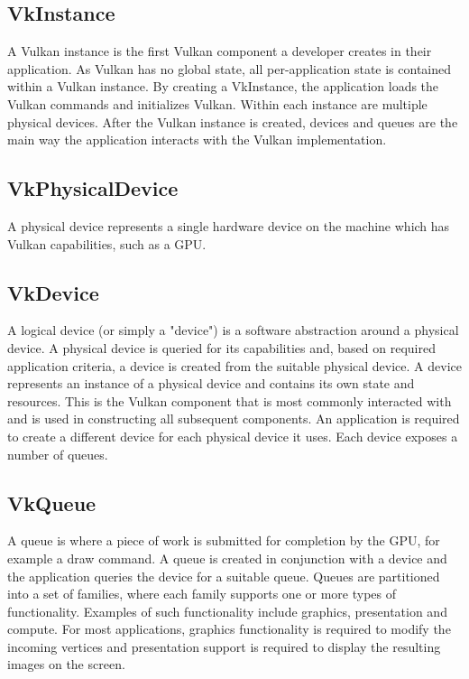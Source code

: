 \documentclass[12pt]{report}
\theoremstyle{definition}
\begin{document}
      \subsection{VkInstance}
      
        A Vulkan instance is the first Vulkan component a developer creates in
        their application.  As Vulkan has no global state, all per-application
        state is contained within a Vulkan instance. By creating a VkInstance,
        the application loads the Vulkan commands and initializes Vulkan.
        Within each instance are multiple physical devices. After the Vulkan
        instance is created, devices and queues are the main
        way the application interacts with the Vulkan implementation.

      \subsection{VkPhysicalDevice}

        A physical device represents a single hardware device on the machine
        which has Vulkan capabilities, such as a GPU.

      \subsection{VkDevice}

        A logical device (or simply a "device") is a software abstraction around a
        physical device. A physical device is queried for its capabilities and,
        based on required application criteria, a device is created from the
        suitable physical device. A device represents an instance of a
        physical device and contains its own state and resources. This is
        the Vulkan component that is most commonly interacted with and is
        used in constructing all subsequent components. An application is
        required to create a different device for each physical device it uses.
        Each device exposes a number of queues.

      \subsection{VkQueue}

        A queue is where a piece of work is submitted for completion by the GPU,
        for example a draw command. A queue is created in conjunction with a
        device and the application queries the device for a suitable queue.
        Queues are partitioned into a set of families, where each family
        supports one or more types of functionality. Examples of such
        functionality include graphics, presentation and compute. For most
        applications, graphics functionality is required to modify the
        incoming vertices and presentation support is required to display
        the resulting images on the screen. \\
\end{document}
